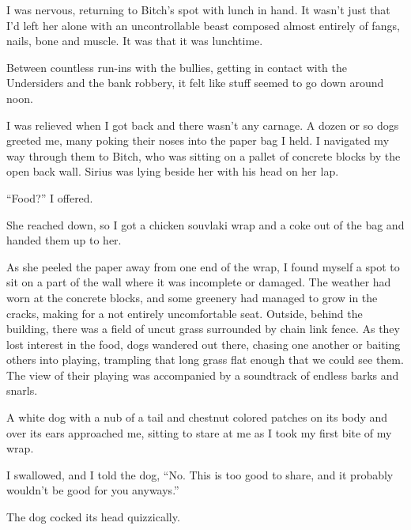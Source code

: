 





I was nervous, returning to Bitch's spot with lunch in hand.  It wasn't just that I'd left her alone with an uncontrollable beast composed almost entirely of fangs, nails, bone and muscle.  It was that it was lunchtime.



Between countless run-ins with the bullies, getting in contact with the Undersiders and the bank robbery, it felt like stuff seemed to go down around noon.



I was relieved when I got back and there wasn't any carnage.  A dozen or so dogs greeted me, many poking their noses into the paper bag I held.  I navigated my way through them to Bitch, who was sitting on a pallet of concrete blocks by the open back wall.  Sirius was lying beside her with his head on her lap.



``Food?'' I offered.



She reached down, so I got a chicken souvlaki wrap and a coke out of the bag and handed them up to her.



As she peeled the paper away from one end of the wrap, I found myself a spot to sit on a part of the wall where it was incomplete or damaged.  The weather had worn at the concrete blocks, and some greenery had managed to grow in the cracks, making for a not entirely uncomfortable seat.  Outside, behind the building, there was a field of uncut grass surrounded by chain link fence.  As they lost interest in the food, dogs wandered out there, chasing one another or baiting others into playing, trampling that long grass flat enough that we could see them.  The view of their playing was accompanied by a soundtrack of endless barks and snarls.



A white dog with a nub of a tail and chestnut colored patches on its body and over its ears approached me, sitting to stare at me as I took my first bite of my wrap.



I swallowed, and I told the dog,  ``No.  This is too good to share, and it probably wouldn't be good for you anyways.''



The dog cocked its head quizzically.



